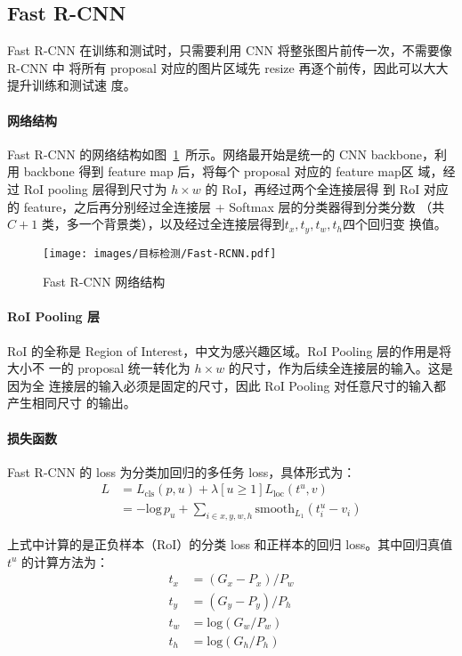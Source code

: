 \subsection{Fast R-CNN}
\label{subsec:Fast-R-CNN}

Fast R-CNN 在训练和测试时，只需要利用 CNN 将整张图片前传一次，不需要像 R-CNN 中
将所有 proposal 对应的图片区域先 resize 再逐个前传，因此可以大大提升训练和测试速
度。

\paragraph{网络结构}
Fast R-CNN 的网络结构如图~\ref{fig:Fast-RCNN}~所示。网络最开始是统一的 CNN
backbone，利用 backbone 得到 feature map 后，将每个 proposal 对应的 feature map区
域，经过 RoI pooling 层得到尺寸为 $h \times w$ 的 RoI，再经过两个全连接层得
到 RoI 对应的 feature，之后再分别经过全连接层 + Softmax 层的分类器得到分类分数
（共 $C+1$ 类，多一个背景类），以及经过全连接层得到$t_x, t_y, t_w, t_h$四个回归变
换值。

\begin{figure}[ht]
  \centering
  \texttt{[image: images/目标检测/Fast-RCNN.pdf]}
  \caption{Fast R-CNN 网络结构}
  \label{fig:Fast-RCNN}
\end{figure}

\paragraph{RoI Pooling 层}
RoI 的全称是 Region of Interest，中文为感兴趣区域。RoI Pooling 层的作用是将大小不
一的 proposal 统一转化为 $h \times w$ 的尺寸，作为后续全连接层的输入。这是因为全
连接层的输入必须是固定的尺寸，因此 RoI Pooling 对任意尺寸的输入都产生相同尺寸
的输出。

\paragraph{损失函数}
Fast R-CNN 的 loss 为分类加回归的多任务 loss，具体形式为：
\begin{align}
  L & = L_{\mathrm{cls}}(p, u) + \lambda [u \geq 1] L_{\mathrm{loc}}(t^u, v) \\
    & = -\mathrm{log}\,p_u + \sum_{i \in {x, y, w, h}} \mathrm{smooth}_{L_1}(t_i^u - v_i)
\end{align}

上式中计算的是正负样本（RoI）的分类 loss 和正样本的回归 loss。其中回归真值 $t^u$
的计算方法为：
\begin{align}
  t_x & = (G_x - P_x) / P_w \\
  t_y & = (G_y - P_y) / P_h \\
  t_w & = \mathrm{log} (G_w/P_w) \\
  t_h & = \mathrm{log} (G_h/P_h)
\end{align}

